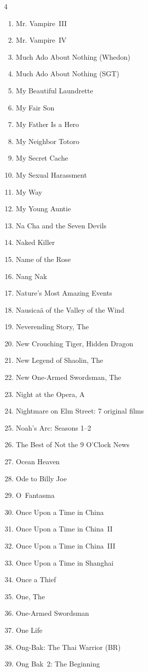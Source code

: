 \documentclass{article}
\begin{document}
\begin{multicols}{4}
\begin{enumerate}
\item Mr. Vampire~III
\item Mr. Vampire~IV
\item Much Ado About Nothing (Whedon)
\item Much Ado About Nothing (SGT)
\item My Beautiful Laundrette
\item My Fair Son
\item My Father Is a Hero
\item My Neighbor Totoro
\item My Secret Cache
\item My Sexual Harassment
\item My Way
\item My Young Auntie
\item Na Cha and the Seven Devils
\item Naked Killer
\item Name of the Rose
\item Nang Nak
\item Nature's Most Amazing Events
\item Nausica\"a of the Valley of the Wind
\item Neverending Story, The
\item New Crouching Tiger, Hidden Dragon
\item New Legend of Shaolin, The
\item New One-Armed Swordsman, The
\item Night at the Opera, A
\item Nightmare on Elm Street: 7 original films
\item Noah's Arc: Seasons 1--2
\item The Best of Not the 9 O'Clock News
\item Ocean Heaven
\item Ode to Billy Joe
\item O~Fantasma
\item Once Upon a Time in China
\item Once Upon a Time in China~II
\item Once Upon a Time in China~III
\item Once Upon a Time in Shanghai
\item Once a Thief
\item One, The
\item One-Armed Swordsman
\item One Life
\item Ong-Bak: The Thai Warrior (BR)
\item Ong Bak~2: The Beginning

\end{enumerate}
\end{multicols}
\end{document}
